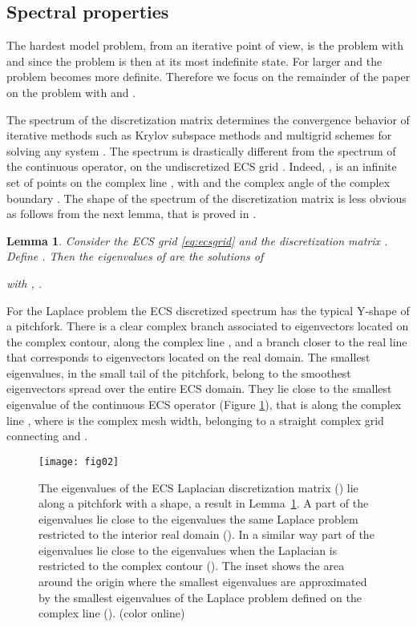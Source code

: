 \documentclass[mathpazo]{cicp}
\newtheorem{lem}[thm]{Lemma}
\theoremstyle{definition}
\numberwithin{equation}{section}
\providecommand{\wv}{}
\providecommand{\edt}{}
\begin{document}
\subsection{Spectral properties}
\wv{The hardest model problem, from a\edt{n iterative point} of view, is 
the problem with  and  since the problem is then \edt{at its} most
indefinite \edt{state}. For larger  and  the problem becomes more
definite. Therefore we focus on the remainder of the paper on the
problem with  and .}

The spectrum of the discretization matrix  determines the
convergence behavior of iterative methods such as Krylov subspace
methods and multigrid schemes for solving any system . The spectrum  is drastically different from the
spectrum  of the continuous operator, on the undiscretized
ECS grid . Indeed, , is an infinite set
of points on the complex line , with
 and  the complex angle of the
complex boundary . The shape of the spectrum  of the
discretization matrix is less obvious as follows from the next lemma,
that is proved in \cite{reps2009}.

\begin{lem}\label{lem:eigdis}
Consider the ECS grid \eqref{eq:ecsgrid} and the discretization matrix . Define . Then the eigenvalues of  are the solutions of

with , .
\end{lem}

For the Laplace problem the ECS discretized spectrum has the typical Y-shape of a pitchfork. There is a clear complex branch associated to eigenvectors located on the complex contour, along the complex line , and a branch closer to the real line  that corresponds to eigenvectors located on the real domain. The smallest eigenvalues, in the small tail of the pitchfork, belong to the smoothest eigenvectors spread over the entire ECS domain. They lie close to the smallest \edt{eigenvalue} of the continuous ECS operator  (Figure \ref{fig:dowsingrod}), that is along the complex line , where  is the complex mesh width, belonging to a straight complex grid connecting  and .
\begin{figure}[h!]
\begin{center}
\texttt{[image: fig02]}\caption{
\wv{ The eigenvalues of the ECS Laplacian discretization matrix () lie along a pitchfork with a  shape, a result in Lemma~\ref{lem:eigdis}. 
 A part of the eigenvalues lie close to the eigenvalues the same Laplace problem restricted to the interior real domain ().  In a similar way part of the eigenvalues lie close to the eigenvalues when the Laplacian is restricted to the complex contour ().} \wv{The inset shows the area around the origin where the smallest eigenvalues are approximated by the smallest eigenvalues of the Laplace problem defined on the complex line } ().
 (color online)}
\label{fig:dowsingrod}
\end{center}
\end{figure}
\end{document}
